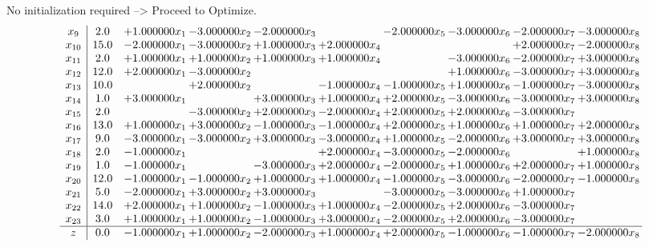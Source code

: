 \documentclass[10pt]{article}
\begin{document}
No initialization required --> Proceed to Optimize. 
\[\begin{array}{c| c c@{\hskip 2pt} c@{\hskip 2pt} c@{\hskip 2pt} c@{\hskip 2pt} c@{\hskip 2pt} c@{\hskip 2pt} c@{\hskip 2pt} c@{\hskip 2pt} }
 x_{9}   &  2.0 & + 1.000000 x_{1} & -3.000000 x_{2} & -2.000000 x_{3} &   & -2.000000 x_{5} & -3.000000 x_{6} & -2.000000 x_{7} & -3.000000 x_{8}\\
 x_{10}   &  15.0 & -2.000000 x_{1} & -3.000000 x_{2} & + 1.000000 x_{3} & + 2.000000 x_{4} &    &   & + 2.000000 x_{7} & -2.000000 x_{8}\\
 x_{11}   &  2.0 & + 1.000000 x_{1} & + 1.000000 x_{2} & + 1.000000 x_{3} & + 1.000000 x_{4} &   & -3.000000 x_{6} & -2.000000 x_{7} & + 3.000000 x_{8}\\
 x_{12}   &  12.0 & + 2.000000 x_{1} & -3.000000 x_{2} &    &    &   & + 1.000000 x_{6} & -3.000000 x_{7} & + 3.000000 x_{8}\\
 x_{13}   &  10.0  &   & + 2.000000 x_{2} &   & -1.000000 x_{4} & -1.000000 x_{5} & + 1.000000 x_{6} & -1.000000 x_{7} & -3.000000 x_{8}\\
 x_{14}   &  1.0 & + 3.000000 x_{1} &   & + 3.000000 x_{3} & + 1.000000 x_{4} & + 2.000000 x_{5} & -3.000000 x_{6} & -3.000000 x_{7} & + 3.000000 x_{8}\\
 x_{15}   &  2.0  &   & -3.000000 x_{2} & + 2.000000 x_{3} & -2.000000 x_{4} & + 2.000000 x_{5} & + 2.000000 x_{6} & -3.000000 x_{7} &   \\
 x_{16}   &  13.0 & + 1.000000 x_{1} & + 3.000000 x_{2} & -1.000000 x_{3} & -1.000000 x_{4} & + 2.000000 x_{5} & + 1.000000 x_{6} & + 1.000000 x_{7} & + 2.000000 x_{8}\\
 x_{17}   &  9.0 & -3.000000 x_{1} & -3.000000 x_{2} & + 3.000000 x_{3} & -3.000000 x_{4} & + 1.000000 x_{5} & -2.000000 x_{6} & + 3.000000 x_{7} & + 3.000000 x_{8}\\
 x_{18}   &  2.0 & -1.000000 x_{1} &    &   & + 2.000000 x_{4} & -3.000000 x_{5} & -2.000000 x_{6} &   & + 1.000000 x_{8}\\
 x_{19}   &  1.0 & -1.000000 x_{1} &   & -3.000000 x_{3} & + 2.000000 x_{4} & -2.000000 x_{5} & + 1.000000 x_{6} & + 2.000000 x_{7} & + 1.000000 x_{8}\\
 x_{20}   &  12.0 & -1.000000 x_{1} & -1.000000 x_{2} & + 1.000000 x_{3} & + 1.000000 x_{4} & -1.000000 x_{5} & -3.000000 x_{6} & -2.000000 x_{7} & -1.000000 x_{8}\\
 x_{21}   &  5.0 & -2.000000 x_{1} & + 3.000000 x_{2} & + 3.000000 x_{3} &   & -3.000000 x_{5} & -3.000000 x_{6} & + 1.000000 x_{7} &   \\
 x_{22}   &  14.0 & + 2.000000 x_{1} & + 1.000000 x_{2} & -1.000000 x_{3} & + 1.000000 x_{4} & -2.000000 x_{5} & + 2.000000 x_{6} & -3.000000 x_{7} &   \\
 x_{23}   &  3.0 & + 1.000000 x_{1} & + 1.000000 x_{2} & -1.000000 x_{3} & + 3.000000 x_{4} & -2.000000 x_{5} & + 2.000000 x_{6} & -3.000000 x_{7} &   \\
\hline
z    &  0.0 & -1.000000 x_{1} & + 1.000000 x_{2} & -2.000000 x_{3} & + 1.000000 x_{4} & + 2.000000 x_{5} & -1.000000 x_{6} & -1.000000 x_{7} & -2.000000 x_{8}\\
\end{array}\]
\end{document}
